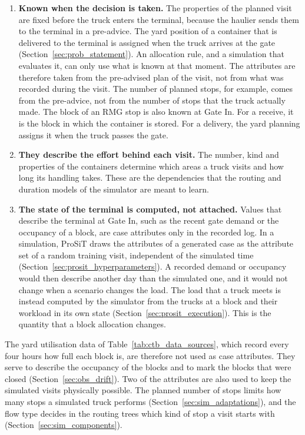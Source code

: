 \begin{enumerate}
\item \textbf{Known when the decision is taken.} The properties of the planned
visit are fixed before the truck enters the terminal, because the haulier sends
them to the terminal in a pre-advice. The yard position of a container that is
delivered to the terminal is assigned when the truck arrives at the gate
(Section~\ref{sec:prob_statement}). An allocation rule, and a simulation that
evaluates it, can only use what is known at that moment. The attributes are
therefore taken from the pre-advised plan of the visit, not from what was recorded
during the visit. The number of planned stops, for example, comes from the
pre-advice, not from the number of stops that the truck actually made. The block
of an RMG stop is also known at Gate In. For a receive, it is the block in which
the container is stored. For a delivery, the yard planning assigns it when the
truck passes the gate.
\item \textbf{They describe the effort behind each visit.} The number, kind and
properties of the containers determine which areas a truck visits and how long
its handling takes. These are the dependencies that the routing and duration
models of the simulator are meant to learn.
\item \textbf{The state of the terminal is computed, not attached.} Values that
describe the terminal at Gate In, such as the recent gate demand or the
occupancy of a block, are case attributes only in the recorded log. In a
simulation, ProSiT draws the attributes of a generated case as the attribute set
of a random training visit, independent of the simulated time
(Section~\ref{sec:prosit_hyperparameters}). A recorded demand or occupancy would
then describe another day than the simulated one, and it would not change when a
scenario changes the load. The load that a truck meets is instead computed by
the simulator from the trucks at a block and their workload in its own state
(Section~\ref{sec:prosit_execution}). This is the quantity that a block allocation
changes.
\end{enumerate}

The yard utilisation data of Table~\ref{tab:ctb_data_sources}, which record every four
hours how full each block is, are therefore not used as case attributes. They
serve to describe the occupancy of the blocks and to mark the blocks that were
closed (Section~\ref{sec:obs_drift}). Two of the
attributes are also used to keep the simulated visits physically possible. The
planned number of stops limits how many stops a simulated truck performs
(Section~\ref{sec:sim_adaptations}), and the flow type decides in the routing
trees which kind of stop a visit starts with (Section~\ref{sec:sim_components}).

